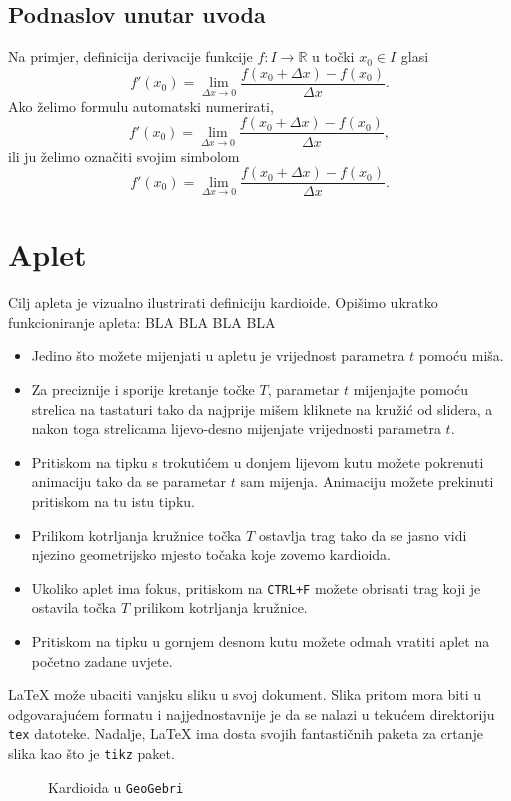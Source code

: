 \documentclass[a4paper,12pt]{article}
\begin{document}
\subsection{Podnaslov unutar uvoda}
Na primjer, definicija derivacije funkcije $f:I\to\mathbb{R}$ u točki $x_0\in I$ glasi
$$f'(x_0)=\lim_{\Delta x\to 0}{\frac{f(x_0+\Delta x)-f(x_0)}{\Delta x}}.$$
Ako želimo formulu automatski numerirati,
\begin{equation}
f'(x_0)=\lim_{\Delta x\to 0}{\frac{f(x_0+\Delta x)-f(x_0)}{\Delta x}},
\end{equation}
ili ju želimo označiti svojim simbolom
\begin{equation}
f'(x_0)=\lim_{\Delta x\to 0}{\frac{f(x_0+\Delta x)-f(x_0)}{\Delta x}}.\tag{$\clubsuit$}
\end{equation}

\newpage

\section{Aplet}
Cilj apleta je vizualno ilustrirati definiciju kardioide. Opišimo ukratko funkcioniranje apleta: BLA BLA BLA BLA
\begin{itemize}
\item Jedino što možete mijenjati u apletu je vrijednost parametra $t$ pomoću miša.
\item Za preciznije i sporije kretanje točke $T$, parametar $t$ mijenjajte pomoću strelica na tastaturi 
tako da najprije mišem kliknete na kružić od slidera, a nakon toga strelicama lijevo-desno mijenjate vrijednosti parametra $t$.
\item Pritiskom na tipku s trokutićem u donjem lijevom kutu možete pokrenuti animaciju tako da se parametar $t$ sam mijenja. Animaciju možete prekinuti pritiskom na tu istu tipku.
\item Prilikom kotrljanja kružnice točka $T$ ostavlja trag tako da se jasno vidi njezino geometrijsko mjesto točaka koje zovemo kardioida.
\item Ukoliko aplet ima fokus, pritiskom na \verb|CTRL+F| možete obrisati trag koji je ostavila točka $T$ prilikom kotrljanja kružnice.
\item Pritiskom na tipku u gornjem desnom kutu možete odmah vratiti aplet na početno zadane uvjete.
\end{itemize}
\LaTeX{} može ubaciti vanjsku sliku u svoj dokument. Slika pritom mora biti u odgovarajućem formatu i najjednostavnije je da se nalazi u tekućem
direktoriju \verb|tex| datoteke. Nadalje, \LaTeX{} ima dosta svojih fantastičnih paketa za crtanje slika kao što je \verb|tikz| paket.\par
\vspace*{5mm}
\begin{figure}[!h]
\centering

\caption{Kardioida u \texttt{GeoGebri}}
\end{figure}
\end{document}
